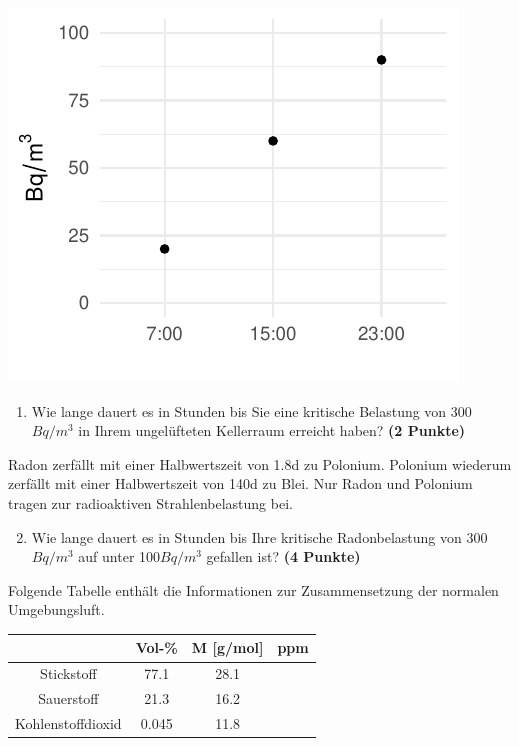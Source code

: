 \documentclass[a4paper, 9pt]{scrartcl}\usepackage[]{graphicx}\usepackage[]{xcolor}
\makeatletter
\def\maxwidth{ %
  \ifdim\Gin@nat@width>\linewidth
    \linewidth
  \else
    \Gin@nat@width
  \fi
}
\newenvironment{knitrout}{}{} %
\makeatother
\begin{document}
\begin{knitrout}
\color{fgcolor}

{\centering \includegraphics[width=\maxwidth]{img/math-10-1} 

}


\end{knitrout}

\vspace{-0.75cm}

\begin{enumerate}
\item Wie lange dauert es in Stunden bis Sie eine kritische Belastung von
  300$Bq/m^3$ in Ihrem ungelüfteten Kellerraum erreicht haben?
  \textbf{(2 Punkte)}
\end{enumerate}

Radon zerfällt mit einer Halbwertszeit von 1.8d zu
Polonium. Polonium wiederum zerfällt mit einer Halbwertszeit von
140d zu Blei. Nur Radon und Polonium tragen zur
radioaktiven Strahlenbelastung bei.

\begin{enumerate}
  \setcounter{enumi}{1}
\item Wie lange dauert es in Stunden bis Ihre kritische Radonbelastung von
  300$Bq/m^3$ auf unter 100$Bq/m^3$ gefallen ist?
  \textbf{(4 Punkte)}
\end{enumerate}

Folgende Tabelle enthält die Informationen zur Zusammensetzung der
normalen Umgebungsluft.

\begin{center}
  \begin{tabular}{ c|c|c|c }
     & Vol-\% & M [g/mol] & ppm \\
    \hline
    Stickstoff & 77.1 & 28.1 &
                                                    \phantom{1000000000000}\strut\\
        \hline
    Sauerstoff & 21.3 & 16.2 &
                                                    \phantom{10000000}\strut\\
        \hline
    Kohlenstoffdioxid & 0.045 & 11.8 & \phantom{10000000}\strut\\     
     \hline
\end{tabular}
\end{center}
\end{document}
